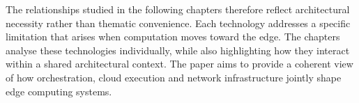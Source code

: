The relationships studied in the following chapters therefore reflect architectural necessity rather than thematic convenience. Each technology addresses a specific limitation that arises when computation moves toward the edge. The chapters analyse these technologies individually, while also highlighting how they interact within a shared architectural context. The paper aims to provide a coherent view of how orchestration, cloud execution and network infrastructure jointly shape edge computing systems. \cite{openai_llm_drafting}
